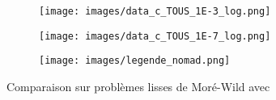 	\begin{figure}[!htb]\label{fig:cs_mw_SMOOTH}
	\centering
	\begin{subfigure}{0.43\textwidth}
		\texttt{[image: images/data\_c\_TOUS\_1E-3\_log.png]}
		\label{fig:data_c_TOUS_1E-3_log}
	\end{subfigure}%
	\begin{subfigure}{0.43\textwidth}
		\texttt{[image: images/data\_c\_TOUS\_1E-7\_log.png]}
		\label{fig:data_c_TOUS_1E-7_log}
	\end{subfigure}
	\smallskip
	\begin{subfigure}{0.95\textwidth}
		\texttt{[image: images/legende\_nomad.png]}
	\end{subfigure}
	\caption{Comparaison sur problèmes lisses de Moré-Wild avec \CS}
\end{figure}